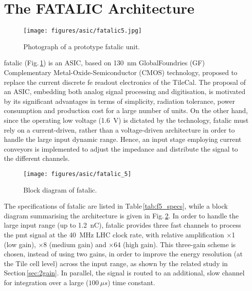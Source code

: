 \section{The FATALIC Architecture}
\label{sec:strategy}

\begin{figure}[b]
\centering
  \texttt{[image: figures/asic/fatalic5.jpg]}
  \caption{Photograph of a prototype \gls{fatalic} unit.\label{fig:fatalic}}
\end{figure}

\gls{fatalic} (Fig.\,\ref{fig:fatalic}) is an ASIC, based on \SI{130}{nm} GlobalFoundries (GF) Complementary Metal-Oxide-Semiconductor 
(CMOS) technology, proposed to replace the current discrete \gls{fe} readout electronics of the \gls{TileCal}. The proposal of an ASIC, 
embedding both analog signal processing and digitisation, is motivated by its significant advantages in terms of simplicity, radiation 
tolerance, power consumption and production cost for a large number of units. On the other hand, since the operating low voltage 
(\SI{1.6}{V}) is dictated by the technology, \gls{fatalic} must rely on a current-driven, rather than a voltage-driven architecture in 
order to handle the large input dynamic range. Hence, an input stage employing current conveyors is implemented to adjust the impedance 
and distribute the signal to the different channels.

\begin{figure}[tb]
  \centering
  \texttt{[image: figures/asic/fatalic\_5]}
  \caption{Block diagram of \gls{fatalic}.}
  \label{fig:fatalic5}
\end{figure}

The specifications of \gls{fatalic} are listed in Table\,\ref{tab:f5_specs}, while a block diagram summarising the architecture is given 
in Fig.\,\ref{fig:fatalic5}. In order to handle the large input range (up to \SI{1.2}{nC}), \gls{fatalic} provides three fast channels to
process the \gls{pmt} signal at the \SI{40}{MHz} LHC clock rate, with relative amplification $\times$1 (low gain), $\times$8 (medium gain)
and $\times$64 (high gain). This three-gain scheme is chosen, instead of using two gains, in order to improve the energy resolution (at the
Tile cell level) across the input range, as shown by the related study in Section\,\ref{sec:2gain}. In parallel, the signal is routed to an 
additional, slow channel for integration over a large ($\SI{100}{\mu s}$) time constant.

